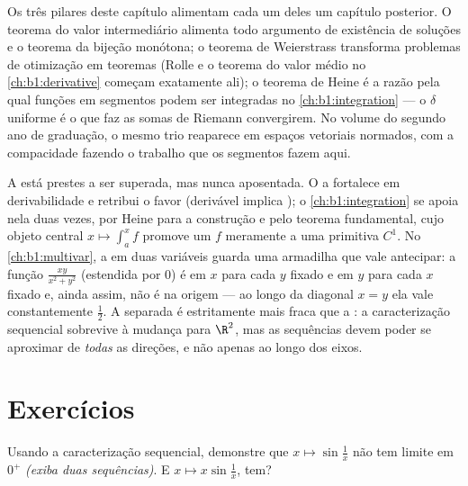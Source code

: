 \begin{remark}
Os três pilares deste capítulo alimentam cada um deles um capítulo
posterior. O teorema do valor intermediário alimenta todo argumento de
existência de soluções e o teorema da bijeção monótona; o teorema de
Weierstrass transforma problemas de otimização em teoremas (Rolle e o
teorema do valor médio no \cref{ch:b1:derivative} começam exatamente
ali); o teorema de Heine é a razão pela qual funções  em
segmentos podem ser integradas no \cref{ch:b1:integration} --- o
$\delta$ uniforme é o que faz as somas de Riemann convergirem. No
volume do segundo ano de graduação, o mesmo trio reaparece em espaços
vetoriais normados, com a compacidade fazendo o trabalho que os
segmentos fazem aqui.
\end{remark}

\begin{remark}
A  está prestes a ser superada, mas nunca aposentada.
O  a fortalece em derivabilidade e
retribui o favor (derivável implica );
o \cref{ch:b1:integration} se apoia nela duas vezes, por Heine para
a construção e pelo teorema fundamental, cujo
objeto central $x \mapsto \int_a^x f$ promove um $f$ meramente
 a uma primitiva $C^1$. No
\cref{ch:b1:multivar}, a  em duas variáveis guarda uma armadilha
que vale antecipar: a função $\frac{xy}{x^2 + y^2}$ (estendida
por $0$) é  em $x$ para cada $y$ fixado e em $y$ para
cada $x$ fixado e, ainda assim, não é  na origem --- ao longo da
diagonal $x = y$ ela vale constantemente $\frac12$. A 
separada é estritamente mais fraca que a : a caracterização
sequencial sobrevive à mudança para $\R^2$, mas as sequências devem
poder se aproximar de \emph{todas} as direções, e não apenas ao longo
dos eixos.
\end{remark}

\section{Exercícios}

\begin{exercise}[$\star$]\label{exo:b1:continuity:1}
Usando a caracterização sequencial, demonstre que $x \mapsto
\sin\frac 1x$ não tem limite em $0^+$ \emph{(exiba duas sequências)}.
E $x \mapsto x \sin\frac 1x$, tem?
\end{exercise}

